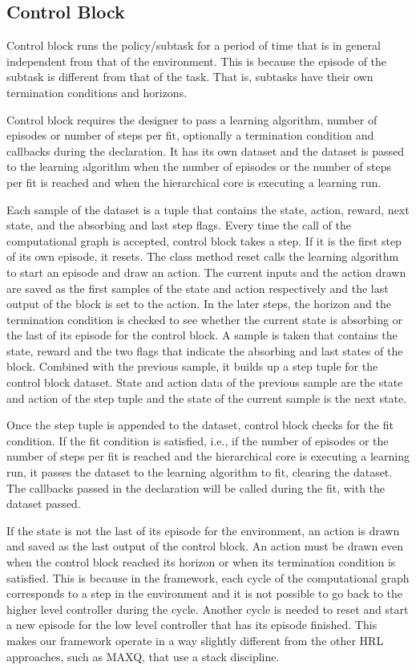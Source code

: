 \subsection{Control Block}

Control block runs the policy/subtask for a period of time that is in general independent from that of the environment. This is because the episode of the subtask is different from that of the task. That is, subtasks have their own termination conditions and horizons.

Control block requires the designer to pass a learning algorithm, number of episodes or number of steps per fit, optionally a termination condition and callbacks during the declaration. It has its own dataset and the dataset is passed to the learning algorithm when the number of episodes or the number of steps per fit is reached and when the hierarchical core is executing a learning run.

Each sample of the dataset is a tuple that contains the state, action, reward, next state, and the absorbing and last step flags. Every time the call of the computational graph is accepted, control block takes a step. If it is the first step of its own episode, it resets. The class method reset calls the learning algorithm to start an episode and draw an action. The current inputs and the action drawn are saved as the first samples of the state and action respectively and the last output of the block is set to the action. In the later steps, the horizon and the termination condition is checked to see whether the current state is absorbing or the last of its episode for the control block. A sample is taken that contains the state, reward and the two flags that indicate the absorbing and last states of the block. Combined with the previous sample, it builds up a step tuple for the control block dataset. State and action data of the previous sample are the state and action of the step tuple and the state of the current sample is the next state. 

Once the step tuple is appended to the dataset, control block checks for the fit condition. If the fit condition is satisfied, i.e., if the number of episodes or the number of steps per fit is reached and the hierarchical core is executing a learning run, it passes the dataset to the learning algorithm to fit, clearing the dataset. The callbacks passed in the declaration will be called during the fit, with the dataset passed. 

If the state is not the last of its episode for the environment, an action is drawn and saved as the last output of the control block. An action must be drawn even when the control block reached its horizon or when its termination condition is satisfied. This is because in the framework, each cycle of the computational graph corresponds to a step in the environment and it is not possible to go back to the higher level controller during the cycle. Another cycle is needed to reset and start a new episode for the low level controller that has its episode finished. This makes our framework operate in a way slightly different from the other HRL approaches, such as MAXQ, that use a stack discipline.

